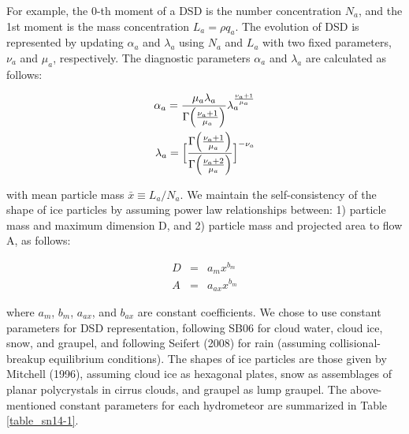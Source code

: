 For example, the 0-th moment of a DSD is the number concentration $N_{a}$, and the 1st moment is the mass concentration $L_{a} = \rho q_{a}$. The evolution of DSD is represented by updating $\alpha_{a}$ and $\lambda_{a}$ using $N_{a}$ and $L_{a}$ with two fixed parameters, $\nu_{a}$ and $\mu_{a}$, respectively. The diagnostic parameters $\alpha_{a}$ and $\lambda_{a}$ are calculated as follows:

\begin{eqnarray}
\alpha_{a}=\frac{\mu_{a}\lambda_{a}}{\Gamma\Bigl(\frac{\nu_{a}+1}{\mu_{a}}\Bigr)}\lambda_{a}^{\frac{\nu_{a}+1}{\mu_{a}}}\\
\label{sn9}
\lambda_{a}=\Bigl[\frac{\Gamma\Bigl(\frac{\nu_{a}+1}{\mu_{a}}\Bigr)}{\Gamma\Bigl(\frac{\nu_{a}+2}{\mu_{a}}\Bigr)}\Bigr]^{-\nu_{a}}\nonumber
\end{eqnarray}

with mean particle mass $\bar{x}\equiv L_{a}/N_{a}$. We maintain the self-consistency of the shape of ice particles by assuming power law relationships between: 1) particle mass and maximum dimension D, and 2) particle mass and projected area to flow A, as follows:

\begin{eqnarray}
D&=&a_{m}x^{b_{m}}\\
\label{sn10}
A&=&a_{ax}x^{b_{m}}
\label{sn11}
\end{eqnarray}

where $a_{m}$, $b_{m}$, $a_{ax}$, and $b_{ax}$ are constant coefficients. We chose to use constant parameters for DSD representation, following SB06 for cloud water, cloud ice, snow, and graupel, and following Seifert (2008) for rain (assuming collisional-breakup equilibrium conditions). The shapes of ice particles are those given by Mitchell (1996), assuming cloud ice as hexagonal plates, snow as assemblages of planar polycrystals in cirrus clouds, and graupel as lump graupel. The above-mentioned constant parameters for each hydrometeor are summarized in Table \ref{table_sn14-1}.

